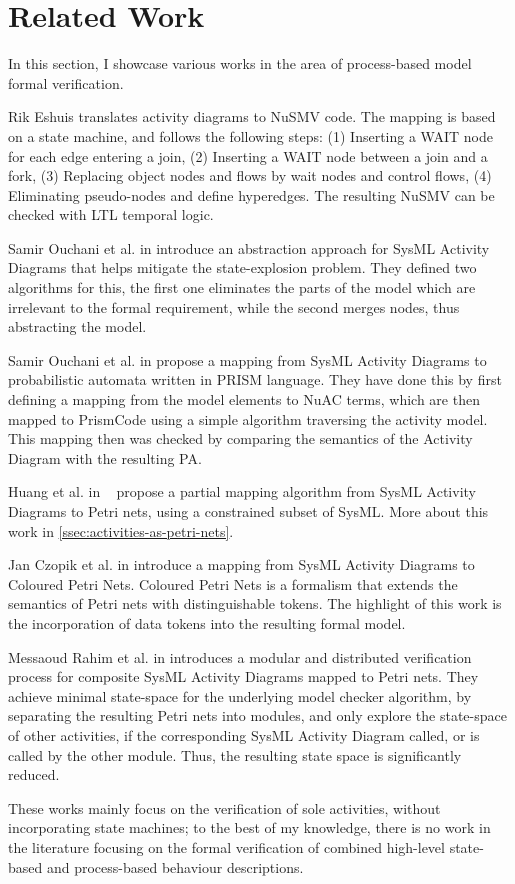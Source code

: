 \clearpage\section{Related Work}\label{sec:related-work}

In this section, I showcase various works in the area of process-based model formal verification.

Rik Eshuis \cite{10.1145/1125808.1125809} translates activity diagrams to NuSMV code. The mapping is based on a state machine, and follows the following steps: (1) Inserting a WAIT node for each edge entering a join, (2) Inserting a WAIT node between a join and a fork, (3) Replacing object nodes and flows by wait nodes and control flows, (4) Eliminating pseudo-nodes and define hyperedges. The resulting NuSMV can be checked with LTL temporal logic.

Samir Ouchani et al. in \cite{10.1007/978-3-642-33826-7_18} introduce an abstraction approach for SysML Activity Diagrams that helps mitigate the state-explosion problem. They defined two algorithms for this, the first one eliminates the parts of the model which are irrelevant to the formal requirement, while the second merges nodes, thus abstracting the model.

Samir Ouchani et al. in \cite{OUCHANI20142713} propose a mapping from SysML Activity Diagrams to probabilistic automata written in PRISM language. They have done this by first defining a mapping from the model elements to NuAC terms, which are then mapped to PrismCode using a simple algorithm traversing the activity model. This mapping then was checked by comparing the semantics of the Activity Diagram with the resulting PA.

Huang et al. in ~\cite{https://doi.org/10.1002/sys.21524} propose a partial mapping algorithm from SysML Activity Diagrams to Petri nets, using a constrained subset of SysML. More about this work in \autoref{ssec:activities-as-petri-nets}.

Jan Czopik et al. in \cite{10.1007/978-3-319-08156-4_36} introduce a mapping from SysML Activity Diagrams to Coloured Petri Nets. Coloured Petri Nets is a formalism that extends the semantics of Petri nets with distinguishable tokens. The highlight of this work is the incorporation of data tokens into the resulting formal model.

Messaoud Rahim et al. in \cite{rahim:hal-00935748} introduces a modular and distributed verification process for composite SysML Activity Diagrams mapped to Petri nets. They achieve minimal state-space for the underlying model checker algorithm, by separating the resulting Petri nets into modules, and only explore the state-space of other activities, if the corresponding SysML Activity Diagram called, or is called by the other module. Thus, the resulting state space is significantly reduced.

These works mainly focus on the verification of sole activities, without incorporating state machines; to the best of my knowledge, there is no work in the literature focusing on the formal verification of combined high-level state-based and process-based behaviour descriptions.
